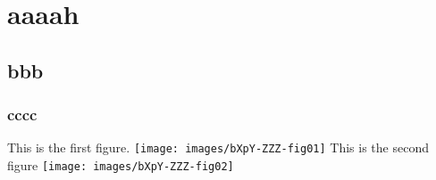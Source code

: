\documentclass[11pt]{amsbook}
\begin{document}




\section{aaaah}






\subsection{bbb}





\subsubsection{cccc}

This is the first figure. 
	\texttt{[image: images/bXpY-ZZZ-fig01]}
This is the second figure
	\texttt{[image: images/bXpY-ZZZ-fig02]}






\end{document}
